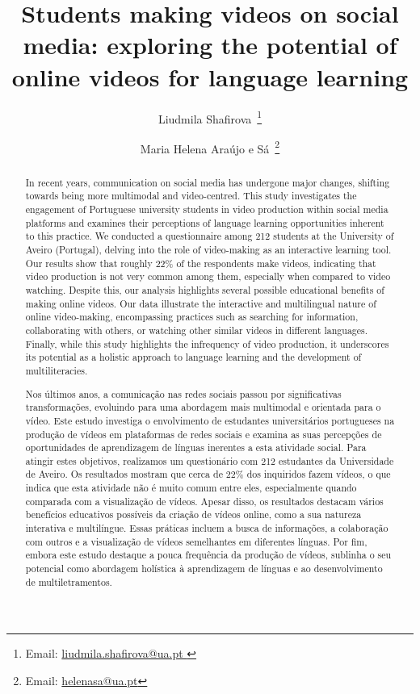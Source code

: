 \documentclass[english]{textolivre}
\title{Students making videos on social media: exploring the potential of online videos for language learning}
\author[1]{Liudmila Shafirova~\orcid{0000-0003-3743-2029}\thanks{Email: \href{mailto:liudmila.shafirova@ua.pt }{liudmila.shafirova@ua.pt }}}
\author[1]{Maria Helena Araújo e Sá~\orcid{0000-0002-6623-9642}\thanks{Email: \href{mailto:helenasa@ua.pt}{helenasa@ua.pt}}}
\affil[1]{University of Aveiro, Department of Education and Psychology, CIDTFF, Aveiro, Portugal.}
\begin{document}
	
\maketitle
\begin{polyabstract}

\begin{abstract}
In recent years, communication on social media has undergone major changes, shifting towards being more multimodal and video-centred. This study investigates the engagement of Portuguese university students in video production within social media platforms and examines their perceptions of language learning opportunities inherent to this practice. We conducted a questionnaire among 212 students at the University of Aveiro (Portugal), delving into the role of video-making as an interactive learning tool. Our results show that roughly 22\% of the respondents make videos, indicating that video production is not very common among them, especially when compared to video watching. Despite this, our analysis highlights several possible educational benefits of making online videos. Our data illustrate the interactive and multilingual nature of online video-making, encompassing practices such as searching for information, collaborating with others, or watching other similar videos in different languages. Finally, while this study highlights the infrequency of video production, it underscores its potential as a holistic approach to language learning and the development of multiliteracies.


\end{abstract}

\begin{portuguese}
\begin{abstract}
Nos últimos anos, a comunicação nas redes sociais passou por significativas transformações, evoluindo para uma abordagem mais multimodal e orientada para o vídeo. Este estudo investiga o envolvimento de estudantes universitários portugueses na produção de vídeos em plataformas de redes sociais e examina as suas percepções de oportunidades de aprendizagem de línguas inerentes a esta atividade social. Para atingir estes objetivos, realizamos um questionário com 212 estudantes da Universidade de Aveiro. Os resultados mostram que cerca de 22\% dos inquiridos fazem vídeos, o que indica que esta atividade não é muito comum entre eles, especialmente quando comparada com a visualização de vídeos. Apesar disso, os resultados destacam vários benefícios educativos possíveis da criação de vídeos online, como a sua natureza interativa e multilíngue. Essas práticas incluem a busca de informações, a colaboração com outros e a visualização de vídeos semelhantes em diferentes línguas. Por fim, embora este estudo destaque a pouca frequência da produção de vídeos, sublinha o seu potencial como abordagem holística à aprendizagem de línguas e ao desenvolvimento de multiletramentos.


\end{abstract}
\end{portuguese}
\end{polyabstract}
\end{document}
